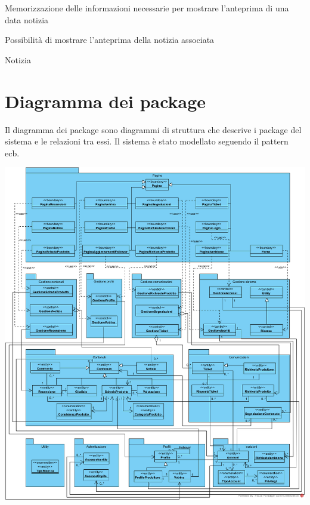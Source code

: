 
{\begin{itemWork}
	\item Memorizzazione delle informazioni necessarie per mostrare l'anteprima di una data notizia
	\item Possibilità di mostrare l'anteprima della notizia associata
\end{itemWork}}
{\begin{itemWork}
	\item Notizia
\end{itemWork}}


\section{Diagramma dei package}  \label{cha:package}
Il diagramma dei package sono diagrammi di struttura che descrive i package del sistema e le relazioni tra essi. Il sistema è stato modellato seguendo il pattern \gls{ecb}.
\begin{center}
			\includegraphics[width=\linewidth]{assets/visualParadigm/package/DiagrammaPacakage}
\end{center}

